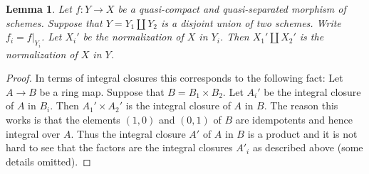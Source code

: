 \documentclass[10pt,a4paper]{amsart}
\theoremstyle{plain}
\newtheorem{lemma}[subsection]{Lemma}
\theoremstyle{definition}
\theoremstyle{remark}
\numberwithin{equation}{subsection}
\begin{document}
\begin{lemma}
\label{lemma-normalization-in-disjoint-union}
Let $f : Y \to X$ be a quasi-compact and quasi-separated morphism of schemes.
Suppose that $Y = Y_1 \amalg Y_2$ is a disjoint union of two schemes.
Write $f_i = f|_{Y_i}$. Let $X_i'$ be the normalization of $X$ in $Y_i$.
Then $X_1' \amalg X_2'$ is the normalization of $X$ in $Y$.
\end{lemma}

\begin{proof}
In terms of integral closures this corresponds to the following fact:
Let $A \to B$ be a ring map. Suppose that $B = B_1 \times B_2$.
Let $A_i'$ be the integral closure of $A$ in $B_i$. Then
$A_1' \times A_2'$ is the integral closure of $A$ in $B$.
The reason this works is that the elements $(1, 0)$ and $(0, 1)$ of $B$
are idempotents and hence integral over $A$. Thus the integral closure
$A'$ of $A$ in $B$ is a product and it is not hard to see that the factors
are the integral closures $A'_i$ as described above (some details
omitted).
\end{proof}
\end{document}
